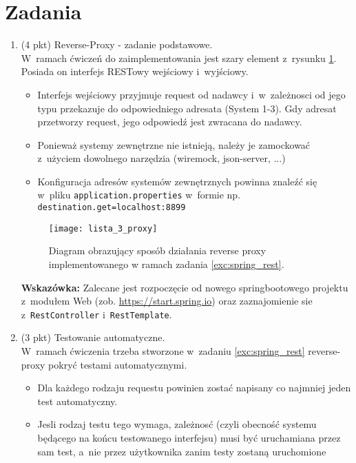 \documentclass[12pt]{article}
\begin{document}
    \section*{Zadania}
    \begin{enumerate}
        \item\label{exc:spring_rest}
            (4 pkt) Reverse-Proxy - zadanie podstawowe.\\
            W~ramach ćwiczeń do zaimplementowania jest szary element z~rysunku \ref{fig:lista_3_proxy}. Posiada on interfejs RESTowy wejściowy i~wyjściowy.
            \begin{itemize}
                \item Interfejs wejściowy przyjmuje request od nadawcy i~w~zależnosci od jego typu przekazuje do odpowiedniego adresata (System 1-3). Gdy adresat przetworzy request, jego odpowiedź jest zwracana do nadawcy.
                \item Ponieważ systemy zewnętrzne nie istnieją, należy je zamockować z~użyciem dowolnego narzędzia (wiremock, json-server, ...)
                \item Konfiguracja adresów systemów zewnętrznych powinna znaleźć się w~pliku \texttt{applica\-tion.pro\-per\-ties} w~formie np. \texttt{destination.get=localhost:8899}
            \end{itemize}
            
	\begin{figure}[hb]
        \centering
        \texttt{[image: lista\_3\_proxy]}
        \caption{Diagram obrazujący sposób działania reverse proxy implementowanego w ramach zadania \ref{exc:spring_rest}.}
        \label{fig:lista_3_proxy}
    \end{figure}

    \textbf{Wskazówka:} Zalecane jest rozpoczęcie od nowego springbootowego projektu z~modułem Web (zob. \url{https://start.spring.io}) oraz zaznajomienie sie z~\texttt{RestController} i~\texttt{RestTemplate}.

        \item\label{exc:spring_rest_test}
            (3 pkt) Testowanie automatyczne.\\
W~ramach ćwiczenia trzeba stworzone w~zadaniu \ref{exc:spring_rest} reverse-proxy pokryć testami automatycznymi.
\begin{itemize}
        \item Dla każdego rodzaju requestu powinien zostać napisany co najmniej jeden test automatyczny.
        \item Jesli rodzaj testu tego wymaga, zależnosć (czyli obecność systemu będącego na końcu testowanego interfejsu) musi być uruchamiana przez sam test, a~nie przez użytkownika zanim testy zostaną uruchomione
\end{itemize}


\end{enumerate}
\end{document}
